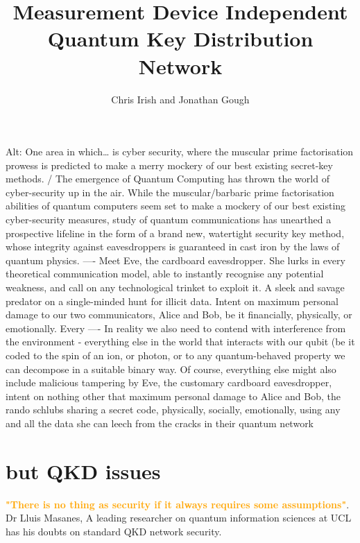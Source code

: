 \documentclass[journal]{vgtc}
\title{Measurement Device Independent Quantum Key Distribution Network}
\author{Chris Irish and Jonathan Gough}
\begin{document}

\maketitle

Alt: One area in which… is cyber security, where the
muscular prime factorisation prowess is predicted to make
a merry mockery of our best existing secret-key methods. /
The emergence of Quantum Computing has thrown the
world of cyber-security up in the air.
While the muscular/barbaric prime factorisation abilities of
quantum computers seem set to make a mockery of our
best existing cyber-security measures, study of quantum
communications has unearthed a prospective lifeline in the
form of a brand new, watertight security key method,
whose integrity against eavesdroppers is guaranteed in
cast iron by the laws of quantum physics.
----
Meet Eve, the cardboard eavesdropper. She lurks in every
theoretical communication model, able to instantly
recognise any potential weakness, and call on any
technological trinket to exploit it. A sleek and savage
predator on a single-minded hunt for illicit data. Intent on
maximum personal damage to our two communicators,
Alice and Bob, be it financially, physically, or emotionally.
Every
----
In reality we also need to contend with interference from
the environment - everything else in the world that
interacts with our qubit (be it coded to the spin of an ion, or
photon, or to any quantum-behaved property we can
decompose in a suitable binary way.
Of course, everything else might also include malicious
tampering by Eve, the customary cardboard
eavesdropper, intent on nothing other that maximum
personal damage to Alice and Bob, the rando schlubs
sharing a secret code, physically, socially, emotionally,
using any and all the data she can leech from the cracks
in their quantum network



\section{but QKD issues}
\textcolor{orange}{\textbf{"There is no thing as security if it always requires some assumptions"}}. Dr Lluis Masanes,  A leading researcher on quantum information sciences at UCL has his doubts on standard QKD network security.   

\vspace{0.3cm}
\end{document}
